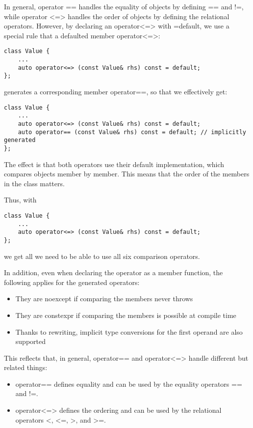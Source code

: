 In general, operator == handles the equality of objects by defining == and !=, while operator <=> handles the order of objects by defining the relational operators. However, by declaring an operator<=> with =default, we use a special rule that a defaulted member operator<=>:

\begin{lstlisting}[style=styleCXX]
class Value {
	...
	auto operator<=> (const Value& rhs) const = default;
};
\end{lstlisting}

generates a corresponding member operator==, so that we effectively get:

\begin{lstlisting}[style=styleCXX]
class Value {
	...
	auto operator<=> (const Value& rhs) const = default;
	auto operator== (const Value& rhs) const = default; // implicitly generated
};
\end{lstlisting}

The effect is that both operators use their default implementation, which compares objects member by member. This means that the order of the members in the class matters.

Thus, with

\begin{lstlisting}[style=styleCXX]
class Value {
	...
	auto operator<=> (const Value& rhs) const = default;
};
\end{lstlisting}

we get all we need to be able to use all six comparison operators.

In addition, even when declaring the operator as a member function, the following applies for the generated operators:

\begin{itemize}
\item
They are noexcept if comparing the members never throws

\item
They are constexpr if comparing the members is possible at compile time

\item
Thanks to rewriting, implicit type conversions for the first operand are also supported
\end{itemize}

This reflects that, in general, operator== and operator<=> handle different but related things:

\begin{itemize}
\item
operator== defines equality and can be used by the equality operators == and !=.

\item
operator<=> defines the ordering and can be used by the relational operators <, <=, >, and >=.
\end{itemize}

